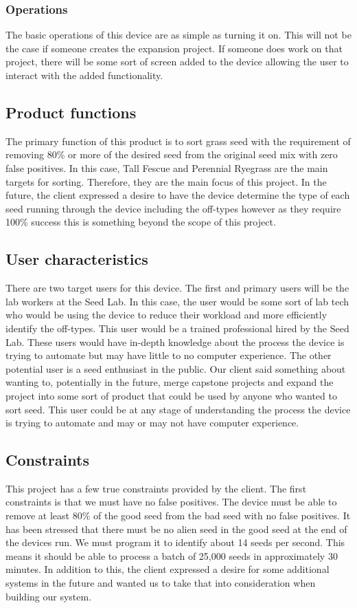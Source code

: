 \documentclass[onecolumn, draftclsnofoot,10pt, compsoc]{IEEEtran}
\begin{document}
	\subsubsection{Operations}
	The basic operations of this device are as simple as turning it on.
	This will not be the case if someone creates the expansion project.
	If someone does work on that project, there will be some sort of screen added to the device allowing the user to interact with the added functionality.
	
	\subsection{Product functions}
	The primary function of this product is to sort grass seed with the requirement of removing 80\% or more of the desired seed from the original seed mix with zero false positives.
	In this case, Tall Fescue and Perennial Ryegrass are the main targets for sorting. Therefore, they are the main focus of this project. 
	In the future, the client expressed a desire to have the device determine the type of each seed running through the device including the off-types however as they require 100\% success this is something beyond the scope of this project.
	
	\subsection{User characteristics}
	There are two target users for this device.
	The first and primary users will be the lab workers at the Seed Lab. In this case, the user would be some sort of lab tech who would be using the device to reduce their workload and more efficiently identify the off-types.
	This user would be a trained professional hired by the Seed Lab.
	These users would have in-depth knowledge about the process the device is trying to automate but may have little to no computer experience.
	The other potential user is a seed enthusiast in the public.
	Our client said something about wanting to, potentially in the future, merge capstone projects and expand the project into some sort of product that could be used by anyone who wanted to sort seed.
	This user could be at any stage of understanding the process the device is trying to automate and may or may not have computer experience.
	
	\subsection{Constraints}
	This project has a few true constraints provided by the client.
	The first constraints is that we must have no false positives.
	The device must be able to remove at least 80\% of the good seed from the bad seed with no false positives.
	It has been stressed that there must be no alien seed in the good seed at the end of the devices run.
	We must program it to identify about 14 seeds per second.
	This means it should be able to process a batch of 25,000 seeds in approximately 30 minutes.
	In addition to this, the client expressed a desire for some additional systems in the future and wanted us to take that into consideration when building our system.
	
\end{document}
